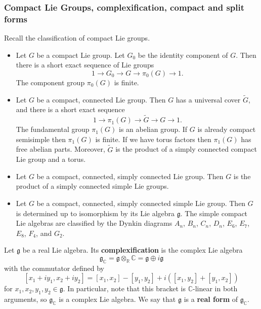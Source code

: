 \documentclass[12pt]{article}
\begin{document}
\subsubsection{Compact Lie Groups, complexification, compact and split forms}

Recall the classification of compact Lie groups. \begin{itemize}
    \item Let $G$ be a compact Lie group. Let $G_0$ be the identity component of $G$. Then there is a short exact sequence of Lie groups
          \[1 \to G_0 \to G \to \pi_0(G) \to 1.\]
          The component group $\pi_0(G)$ is finite.
    \item Let $G$ be a compact, connected Lie group. Then $G$ has a universal cover $\tilde{G}$, and there is a short exact sequence
          \[1 \to \pi_1(G) \to \tilde{G} \to G \to 1.\]
          The fundamental group $\pi_1(G)$ is an abelian group. If $G$ is already compact semisimple then $\pi_1(G)$ is finite. If we have torus factors then $\pi_1(G)$ has free abelian parts.
          Moreover, $\tilde G$ is the product of a simply connected compact Lie group and a torus.
    \item Let $G$ be a compact, connected, simply connected Lie group. Then $G$ is the product of a simply connected simple Lie groups.
    \item Let $G$ be a compact, connected, simply connected simple Lie group. Then $G$ is determined up to isomorphism by its Lie algebra $\mathfrak g$. The simple compact Lie algebras are classified by the Dynkin diagrams $A_n$, $B_n$, $C_n$, $D_n$, $E_6$, $E_7$, $E_8$, $F_4$, and $G_2$.
\end{itemize}


\begin{definition}
    Let $\mathfrak g$ be a real Lie algebra. Its \textbf{complexification} is the complex
    Lie algebra
    \[
        \mathfrak g_{\mathbb C}=\mathfrak g\otimes_{\mathbb R}\mathbb C
        = \mathfrak g \oplus i\mathfrak g
    \]
    with the commutator defined by
    \[[x_1 + i y_1, x_2 + i y_2] = [x_1, x_2] - [y_1, y_2] + i([x_1, y_2] + [y_1, x_2])\]
    for $x_1, x_2, y_1, y_2 \in \mathfrak g$. In particular, note that this bracket is $\mathbb C$-linear in both arguments, so $\mathfrak g_{\mathbb C}$ is a complex Lie algebra. We say that $\mathfrak g$ is a \textbf{real form} of $\mathfrak g_{\mathbb C}$.
\end{definition}
\end{document}
